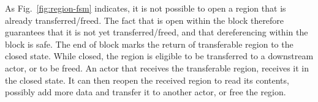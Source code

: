 {As Fig.~\ref{fig:region-fsm}
indicates, it is not possible to open a region that is already
transferred/freed. The fact that  is open within the block
therefore guarantees that it is not yet transferred/freed, and that
dereferencing  within the block is safe. The end of
 block marks the return of transferable region to the closed
state.  While closed, the region is eligible to be transferred to a
downstream actor, or to be freed.  An actor that receives the
transferable region, receives it in the closed state. It can then
reopen the received region to read its contents, possibly add more
data and transfer it to another actor, or free the region. 

}

